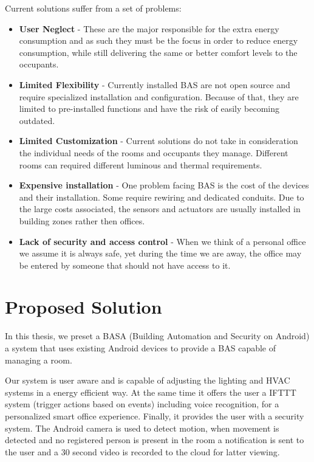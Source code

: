 Current solutions suffer from a set of problems:
\begin{itemize}
\item \textbf{User Neglect} - These are the major responsible for the extra energy consumption and as such they must be the focus in order to reduce energy consumption, while still delivering the same or better comfort levels to the occupants.
\item \textbf{Limited Flexibility} - Currently installed BAS are not open source and require specialized installation and configuration. Because of that, they are limited to pre-installed functions and have the risk of easily becoming outdated.
\item \textbf{Limited Customization} - Current solutions do not take in consideration the individual needs of the rooms and occupants they manage. Different rooms can required different luminous and thermal requirements. 
\item \textbf{Expensive installation} - One problem facing BAS is the cost of the devices and their installation. Some require rewiring  and dedicated conduits. Due to the large costs associated, the sensors and actuators are usually installed in building zones rather then offices.
\item \textbf{Lack of security and access control} - When we think of a personal office we assume it is always safe, yet during the time we are away, the office may be entered by someone that should not have access to it.  
\end{itemize}



\section{Proposed Solution}
\label{section:proposed}


In this thesis, we preset a BASA (Building Automation and Security on Android) a system that uses existing Android devices to provide a \ac{BAS} capable of managing a room. 

Our system is user aware and is capable of adjusting the lighting and \ac{HVAC} systems in a energy efficient way. At the same time it offers the user a \ac{IFTTT} system (trigger actions based on events) including voice recognition, for a personalized smart office experience. Finally, it provides the user with a security system. The Android camera is used to detect motion, when movement is detected and no registered person is present in the room a notification is sent to the user and a 30 second video is recorded to the cloud for latter viewing.



